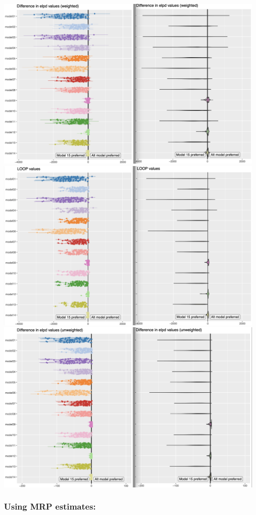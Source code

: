 \documentclass[
]{article}
\begin{document}
\includegraphics{images/image-1.png}
\includegraphics{images/image-2.png}
\includegraphics{images/image-3.png}

\hypertarget{using-mrp-estimates}{%
\subsubsection{\texorpdfstring{\textbf{Using MRP
estimates}:}{Using MRP estimates:}}\label{using-mrp-estimates}}
\end{document}
